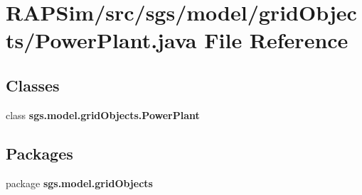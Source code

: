\section{R\-A\-P\-Sim/src/sgs/model/grid\-Objects/\-Power\-Plant.java File Reference}
\label{_power_plant_8java}
\subsection*{Classes}
\begin{DoxyCompactItemize}
\item 
class {\bf sgs.\-model.\-grid\-Objects.\-Power\-Plant}
\end{DoxyCompactItemize}
\subsection*{Packages}
\begin{DoxyCompactItemize}
\item 
package {\bf sgs.\-model.\-grid\-Objects}
\end{DoxyCompactItemize}
